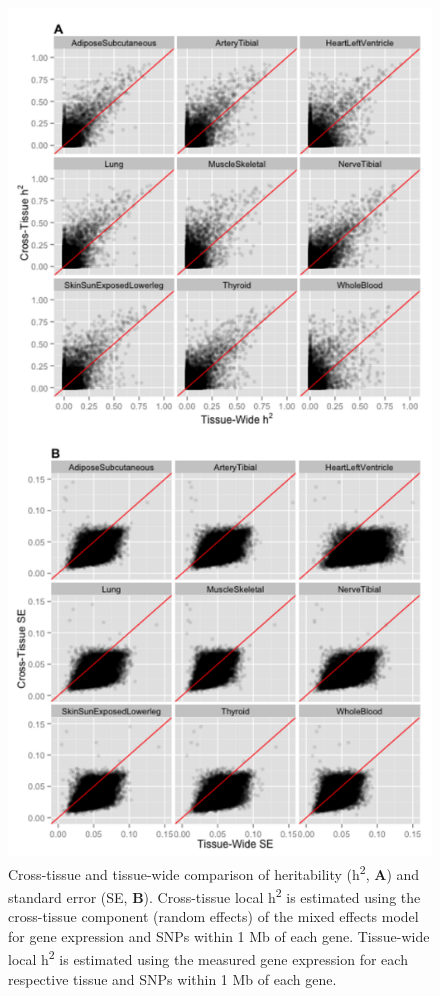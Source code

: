 \documentclass[]{article}
\begin{document}
\begin{figure}[htbp]
\centering
\includegraphics{GenArch_manuscript_files/figure-latex/otdTWh2SE-1.pdf}
\caption{Cross-tissue and tissue-wide comparison of heritability
(h\textsuperscript{2}, \textbf{A}) and standard error (SE, \textbf{B}).
Cross-tissue local h\textsuperscript{2} is estimated using the
cross-tissue component (random effects) of the mixed effects model for
gene expression and SNPs within 1 Mb of each gene. Tissue-wide local
h\textsuperscript{2} is estimated using the measured gene expression for
each respective tissue and SNPs within 1 Mb of each gene.}
\end{figure}
\end{document}
